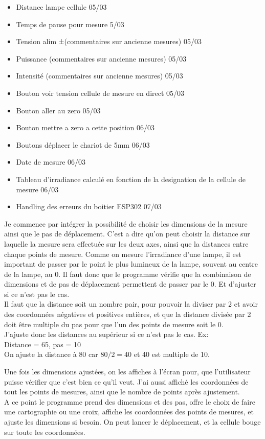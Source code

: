 \documentclass[12pt]{article}
\begin{document}
\begin{itemize}
	\item  Distance lampe cellule  05/03
	\item  Temps de pause pour mesure  5/03
	\item  Tension alim ±(commentaires sur ancienne mesures)  05/03
	\item  Puissance (commentaires sur ancienne mesures)  05/03
	\item  Intensité (commentaires sur ancienne mesures)  05/03
	\item  Bouton voir tension cellule de mesure en direct  05/03
	\item  Bouton aller au zero  05/03
	\item  Bouton mettre a zero a cette position  06/03
	\item  Boutons déplacer le chariot de 5mm  06/03
	\item  Date de mesure  06/03
	\item  Tableau d'irradiance calculé en fonction de la designation de la cellule de mesure  06/03
	\item  Handling des erreurs du boitier ESP302 07/03
\end{itemize}


Je commence par intégrer la possibilité de choisir les dimensions de la mesure ainsi que le pas de déplacement.
C'est a dire qu'on peut choisir la distance sur laquelle la mesure sera effectuée sur les deux axes, ainsi que la distances entre chaque points de mesure.
Comme on mesure l'irradiance d'une lampe, il est important de passer par le point le plus lumineux de la lampe, souvent au centre de la lampe, au 0.
Il faut donc que le programme vérifie que la combinaison de dimensions et de pas de déplacement permettent de passer par le 0.
Et d'ajuster si ce n'est pas le cas.\\
Il faut que la distance soit un nombre pair, pour pouvoir la diviser par 2 et avoir des coordonnées négatives et positives entières, et que la distance divisée par 2 doit être multiple du pas pour que l'un des points de mesure soit le 0.\\
J'ajuste donc les distances au supérieur si ce n'est pas le cas. Ex:\\
Distance = 65, pas = 10\\
On ajuste la distance à 80 car $80/2 = 40$ et 40 est multiple de 10.


Une fois les dimensions ajustées, on les affiches à l'écran pour, que l'utilisateur puisse vérifier que c'est bien ce qu'il veut.
J'ai aussi affiché les coordonnées de tout les points de mesures, ainsi que le nombre de points après ajustement.\\
A ce point le programme prend des dimensions et des pas, offre le choix de faire une cartographie ou une croix, affiche les coordonnées des points de mesures, et ajuste les dimensions si besoin.
On peut lancer le déplacement, et la cellule bouge sur toute les coordonnées.
\end{document}
